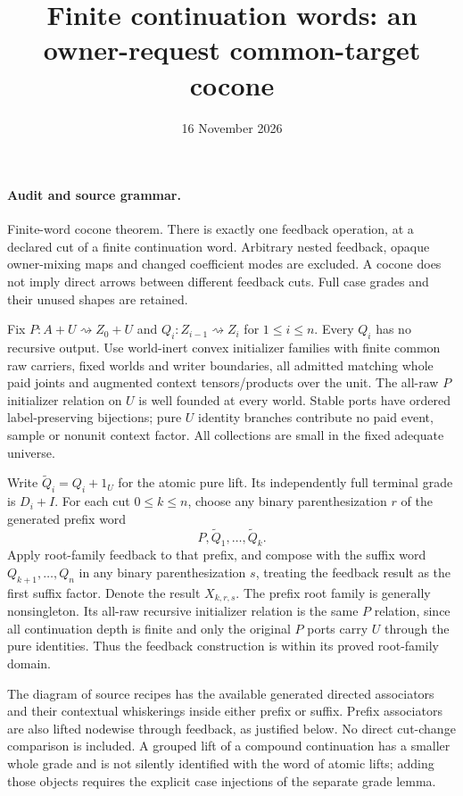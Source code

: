 \documentclass[11pt]{article}\usepackage{amsmath,amssymb,amsthm,geometry}\geometry{margin=1in}\newtheorem{definition}{Definition}\newtheorem{theorem}[definition]{Theorem}
\title{Finite continuation words: an owner-request common-target cocone}\date{16 November 2026}
\begin{document}
\maketitle
\paragraph{Audit and source grammar.} Finite-word cocone theorem. There is exactly one feedback operation, at a declared cut of a finite continuation word. Arbitrary nested feedback, opaque owner-mixing maps and changed coefficient modes are excluded. A cocone does not imply direct arrows between different feedback cuts. Full case grades and their unused shapes are retained.

Fix $P:A+U\rightsquigarrow Z_0+U$ and $Q_i:Z_{i-1}\rightsquigarrow Z_i$ for $1\leq i\leq n$. Every $Q_i$ has no recursive output. Use world-inert convex initializer families with finite common raw carriers, fixed worlds and writer boundaries, all admitted matching whole paid joints and augmented context tensors/products over the unit. The all-raw $P$ initializer relation on $U$ is well founded at every world. Stable ports have ordered label-preserving bijections; pure $U$ identity branches contribute no paid event, sample or nonunit context factor. All collections are small in the fixed adequate universe.

Write $\widetilde Q_i=Q_i+1_U$ for the atomic pure lift. Its independently full terminal grade is $D_i+I$. For each cut $0\leq k\leq n$, choose any binary parenthesization $r$ of the generated prefix word
\[
                     P,\widetilde Q_1,\ldots,\widetilde Q_k.
\]
Apply root-family feedback to that prefix, and compose with the suffix word $Q_{k+1},\ldots,Q_n$ in any binary parenthesization $s$, treating the feedback result as the first suffix factor. Denote the result $X_{k,r,s}$. The prefix root family is generally nonsingleton. Its all-raw recursive initializer relation is the same $P$ relation, since all continuation depth is finite and only the original $P$ ports carry $U$ through the pure identities. Thus the feedback construction is within its proved root-family domain.

The diagram of source recipes has the available generated directed associators and their contextual whiskerings inside either prefix or suffix. Prefix associators are also lifted nodewise through feedback, as justified below. No direct cut-change comparison is included. A grouped lift of a compound continuation has a smaller whole grade and is not silently identified with the word of atomic lifts; adding those objects requires the explicit case injections of the separate grade lemma.
\end{document}
